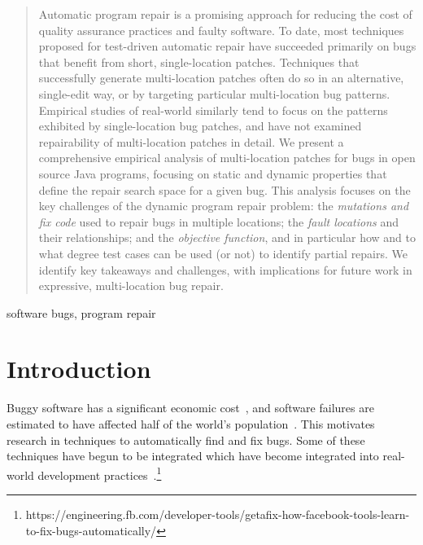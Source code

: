 \documentclass[10pt, conference]{IEEEtran}
\newcommand\todo[1]{\textcolor{red}{#1}}
\begin{document}
\begin{abstract}
    Automatic program repair is a promising approach for reducing the
    cost of quality assurance practices and faulty software. To date, most
    techniques proposed for test-driven automatic repair have succeeded
    primarily on bugs that benefit from short, single-location patches. Techniques
    that successfully generate multi-location patches often do so in an
    alternative, single-edit way, or by targeting particular multi-location bug
    patterns. Empirical studies of real-world similarly tend to focus on the
    patterns exhibited by single-location bug patches, and have not examined repairability
    of multi-location patches in detail. We present a comprehensive empirical analysis
    of multi-location patches for bugs in open source Java programs, focusing on static and
    dynamic properties that define the repair search space for a given bug.
    This analysis focuses on the key challenges of the dynamic program repair
    problem: the \emph{mutations and fix code} used to repair bugs in multiple locations;
    the \emph{fault locations} and their relationships; and the \emph{objective
      function}, and in particular how and to what degree test cases can be used
    (or not) to identify partial repairs. We identify key takeaways and
    challenges, with implications for future work in expressive, multi-location bug
    repair.
\end{abstract}

\begin{IEEEkeywords}
  software bugs, program repair
\end{IEEEkeywords}

\newcommand{\rqorinsight}[2]{
  \setlength{\fboxsep}{0.8em}
  \vspace{0.5em}
  \begin{center}
  \Ovalbox{\begin{minipage}{0.9\linewidth}
    \textbf{RQ#1:} #2
    \end{minipage}}
  \end{center}
  \vspace{0.5em}}

\section{Introduction}


Buggy software has a significant economic cost~\cite{cambridge-study}, and
software failures are estimated to have affected half of the world's
population~\cite{tricentis}.  This motivates research in
techniques to automatically find and fix bugs.  Some of these techniques have
begun to be integrated  which have become integrated into
real-world development practices~\cite{iceland,sapfix}.\footnote{https://engineering.fb.com/developer-tools/getafix-how-facebook-tools-learn-to-fix-bugs-automatically/}
\end{document}
